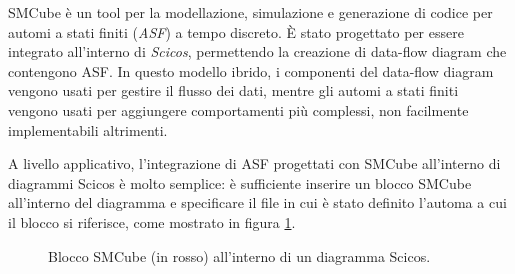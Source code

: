 SMCube\cite{smcube} è un tool per la modellazione, simulazione e generazione di codice per automi a stati finiti (\textsl{ASF}) a tempo discreto. È stato progettato per essere integrato all'interno di \textit{Scicos}\cite{scicos}, permettendo la creazione di data-flow diagram che contengono ASF. In questo modello ibrido, i componenti del data-flow diagram vengono usati per gestire il flusso dei dati, mentre gli automi a stati finiti vengono usati per aggiungere comportamenti più complessi, non facilmente implementabili altrimenti.

A livello applicativo, l'integrazione di ASF progettati con SMCube all'interno di diagrammi Scicos è molto semplice: è sufficiente inserire un blocco SMCube all'interno del diagramma e specificare il file in cui è stato definito l'automa a cui il blocco si riferisce, come mostrato in figura \ref{Fig:smcube_ex}.

\begin{figure}
\centering
{}%
\caption{Blocco SMCube (in rosso) all'interno di un diagramma Scicos.}
\label{Fig:smcube_ex}
\end{figure}